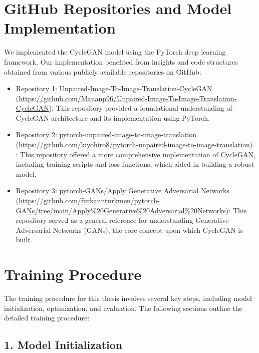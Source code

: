 \documentclass[UKenglish,12pt]{master-style}
\begin{document}
\section*{GitHub Repositories and Model Implementation}

We implemented the CycleGAN model using the PyTorch deep learning framework. Our implementation benefited from insights and code structures obtained from various publicly available repositories on GitHub:
\begin{itemize}
\item Repository 1: Unpaired-Image-To-Image-Translation-CycleGAN (\url{https://github.com/Mananp96/Unpaired-Image-To-Image-Translation-CycleGAN}): This repository provided a foundational understanding of CycleGAN architecture and its implementation using PyTorch.
\item Repository 2: pytorch-unpaired-image-to-image-translation (\url{https://github.com/kiyohiro8/pytorch-unpaired-image-to-image-translation}) : This repository offered a more comprehensive implementation of CycleGAN, including training scripts and loss functions, which aided in building a robust model.
\item Repository 3: pytorch-GANs/Apply Generative Adversarial Networks (\url{https://github.com/furkannturkmen/pytorch-GANs/tree/main/Apply%20Generative%20Adversarial%20Networks}):  This repository served as a general reference for understanding Generative Adversarial Networks (GANs), the core concept upon which CycleGAN is built.
\end{itemize}

\section*{Training Procedure}

The training procedure for this thesis involves several key steps, including model initialization, optimization, and evaluation. The following sections outline the detailed training procedure:

\subsection*{1. Model Initialization}
\end{document}
